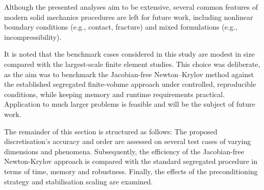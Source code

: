 \documentclass[sn-mathphys,Numbered]{sn-jnl}%
\begin{document}
Although the presented analyses aim to be extensive, several common features of modern solid mechanics procedures are left for future work, including nonlinear boundary conditions (e.g., contact, fracture) and mixed formulations (e.g., incompressibility). %

It is noted that the benchmark cases considered in this study are modest in size compared with the largest-scale finite element studies. This choice was deliberate, as the aim was to benchmark the Jacobian-free Newton–Krylov method against the established segregated finite-volume approach under controlled, reproducible conditions, while keeping memory and runtime requirements practical. Application to much larger problems is feasible and will be the subject of future work.

The remainder of this section is structured as follows:
The proposed discretisation's accuracy and order are assessed on several test cases of varying dimensions and phenomena.
Subsequently, the efficiency of the Jacobian-free Newton-Krylov approach is compared with the standard segregated procedure in terms of time, memory and robustness. Finally, the effects of the preconditioning strategy and stabilisation scaling are examined.


\end{document}
